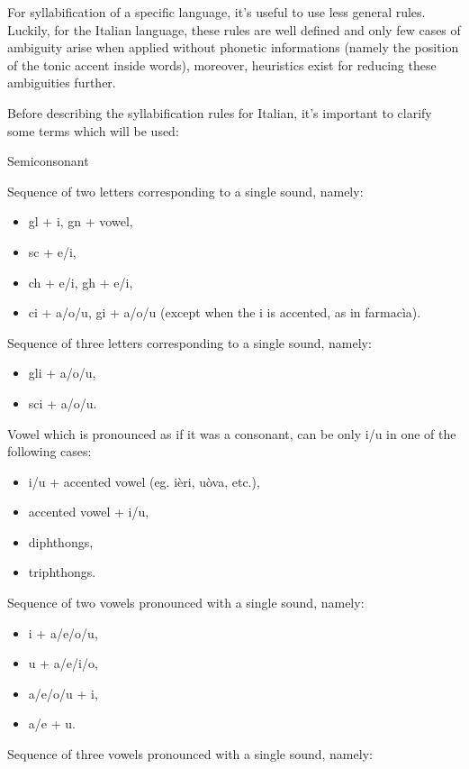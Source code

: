 For syllabification of a specific language, it's useful to use less general rules. Luckily, for the Italian language, these rules are well defined and only few cases of ambiguity arise when applied without phonetic informations (namely the position of the tonic accent inside words), moreover, heuristics exist for reducing these ambiguities further.

Before describing the syllabification rules for Italian, it's important to clarify some terms which will be used:
\begin{labeling}{Semiconsonant}
	\item [Digram] Sequence of two letters corresponding to a single sound, namely:
	\begin{itemize}
		\item gl + i, gn + vowel,
		\item sc + e/i,
		\item ch + e/i, gh + e/i,
		\item ci + a/o/u, gi + a/o/u (except when the i is accented, as in farmacìa).
	\end{itemize}
	\item [Trigram] Sequence of three letters corresponding to a single sound, namely:
	\begin{itemize}
		\item gli + a/o/u,
		\item sci + a/o/u.
	\end{itemize}
	\item [Semiconsonant] Vowel which is pronounced as if it was a consonant, can be only i/u in one of the following cases:
	\begin{itemize}
		\item i/u + accented vowel (eg. ièri, uòva, etc.),
		\item accented vowel + i/u,
		\item diphthongs,
		\item triphthongs.
	\end{itemize}
	\item [Diphthong] Sequence of two vowels pronounced with a single sound, namely:
	\begin{itemize}
		\item i + a/e/o/u,
		\item u + a/e/i/o,
		\item a/e/o/u + i,
		\item a/e + u.
	\end{itemize}
	\item [Triphthong] Sequence of three vowels pronounced with a single sound, namely:

\end{labeling}

